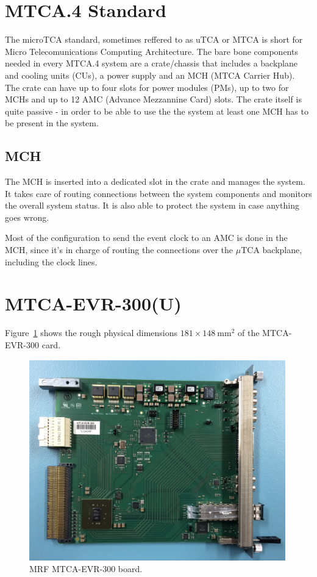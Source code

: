 \documentclass[11pt
  , a4paper
  , article
  , oneside
  , showtrims
]{memoir}
\begin{document}
\section{MTCA.4 Standard}
The microTCA standard, sometimes reffered to as uTCA or MTCA is short for Micro Telecomunications Computing Architecture. The bare bone components needed in every MTCA.4 system are a crate/chassis that includes a backplane and cooling units (CUs), a power supply and an MCH (MTCA Carrier Hub). The crate can have up to four slots for power modules (PMs), up to two for MCHs and up to 12 AMC (Advance Mezzannine Card) slots. The crate itself is quite passive - in order to be able to use the the system at least one MCH has to be present in the system.

\subsection{MCH}
The MCH is inserted into a dedicated slot in the crate and manages the system. It takes care of routing connections between the system components and monitors the overall system status. It is also able to protect the system in case anything goes wrong.

Most of the configuration to send the event clock to an AMC is done in the MCH, since it's in charge of routing the connections over the $\mu$TCA backplane, including the clock lines.


\section{MTCA-EVR-300(U)}
Figure~\ref{fig:mtca-evr300} shows the rough physical dimensions $181\times 148~\mathrm{mm}{}^2$ of the MTCA-EVR-300 card.

\begin{figure}[!htb]
  \centering
  \includegraphics[width=0.99\textwidth]{./pictures/mtca_evr_300.eps}
  \caption{
    MRF MTCA-EVR-300 board.
  }
  \label{fig:mtca-evr300}
\end{figure}
\end{document}
